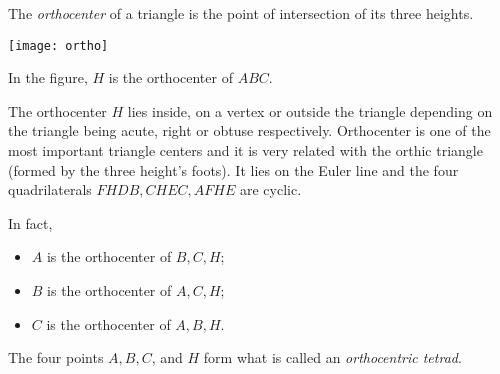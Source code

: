 \documentclass{article}
\begin{document}
The \emph{orthocenter} of a triangle is the point of intersection of its three heights.

\begin{center}\texttt{[image: ortho]}
\end{center}

In the figure, $H$ is the orthocenter of $ABC$. 

The orthocenter $H$ lies inside, on a vertex or outside the triangle depending on the triangle being acute, right or obtuse respectively. Orthocenter is one of the most important triangle centers and it is very related with the orthic triangle (formed by the three height's foots). It lies on the Euler line and the four quadrilaterals $FHDB, CHEC, AFHE$ are cyclic.

In fact,

\begin{itemize}
\item $A$ is the orthocenter of $B, C, H$;
\item $B$ is the orthocenter of $A, C, H$;
\item $C$ is the orthocenter of $A, B, H$.
\end{itemize}


The four points $A, B, C$, and $H$ form what is  called
 an \emph{orthocentric tetrad}.
\end{document}
